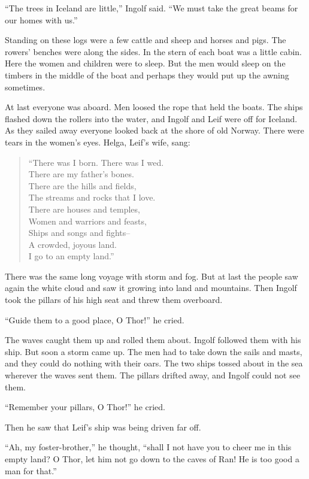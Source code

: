 ``The trees in Iceland are little,'' Ingolf said. ``We must take the
great beams for our homes with us.''

Standing on these logs were a few cattle and sheep and horses and pigs.
The rowers' benches were along the sides. In the stern of each boat was
a little cabin. Here the women and children were to sleep. But the men
would sleep on the timbers in the middle of the boat and perhaps they
would put up the awning sometimes.

At last everyone was aboard. Men loosed the rope that held the boats.
The ships flashed down the rollers into the water, and Ingolf and Leif
were off for Iceland. As they sailed away everyone looked back at the
shore of old Norway. There were tears in the women's eyes. Helga, Leif's
wife, sang:

\begin{quote}
``There was I born. There was I wed.\\
There are my father's bones.\\
There are the hills and fields,\\
The streams and rocks that I love.\\
There are houses and temples,\\
Women and warriors and feasts,\\
Ships and songs and fights--\\
A crowded, joyous land.\\
I go to an empty land.''
\end{quote}

There was the same long voyage with storm and fog. But at last the
people saw again the white cloud and saw it growing into land and
mountains. Then Ingolf took the pillars of his high seat and threw them
overboard.

``Guide them to a good place, O Thor!'' he cried.

The waves caught them up and rolled them about. Ingolf followed them
with his ship. But soon a storm came up. The men had to take down the
sails and masts, and they could do nothing with their oars. The two
ships tossed about in the sea wherever the waves sent them. The pillars
drifted away, and Ingolf could not see them.

``Remember your pillars, O Thor!'' he cried.

Then he saw that Leif's ship was being driven far off.

``Ah, my foster-brother,'' he thought, ``shall I not have you to cheer
me in this empty land? O Thor, let him not go down to the caves of Ran!
He is too good a man for that.''

